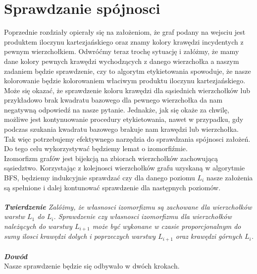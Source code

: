 \documentclass[12pt,a4paper,titlepage]{article}
\begin{document}
\section{Sprawdzanie spójnosci}
Poprzednie rozdziały opierały się na założeniom, że graf podany na wejsciu jest produktem iloczynu kartezjańskiego oraz znamy kolory krawędzi incydentych z pewnym wierzchołkiem. Odwróćmy teraz trochę sytuację i załóżmy, że mamy dane kolory pewnych krawędzi wychodzących z danego wierzchołka a naszym zadaniem będzie sprawdzenie, czy to algorytm etykietowania spowoduje, że nasze kolorowanie będzie kolorowaniem właciwym produktu iloczynu kartezjańskiego. Może się okazać, że sprawdzenie koloru krawędzi dla sąsiednich wierzchołków lub przykładowo brak kwadratu bazowego dla pewnego wierzchołka da nam negatywną odpowiedź na nasze pytanie. Jednakże, jak się okaże za chwilę, możliwe jest kontynuowanie procedury etykietowania, nawet w przypadku, gdy podczas szukania kwadratu bazowego brakuje nam krawędzi lub wierzchołka.\\
Tak więc potrzebujemy efektywnego narzędzia do sprawdzania spójnosci założeń. Do tego celu wykorzystywać będziemy lemat o izomorfiźmie.\\
Izomorfizm grafów jest bijekcją na zbiorach wierzchołków zachowującą sąsiedztwo. Korzystając z kolejnosci wierzchołków grafu uzyskaną w algorytmie BFS, będziemy indukcyjnie sprawdzać czy dla danego poziomu $L_i$ nasze założenia są spełnione i dalej kontunować sprawdzenie dla następnych poziomów. \\
\\
\textit{\textbf{Twierdzenie} Zalóżmy, że własnosci izomorfizmu są zachowane dla wierzchołków warstw $L_1$ do $L_i$. Sprawdzenie czy własnosci izomorfizmu dla wierzchołków należących do warstwy $L_{i+1}$ może być wykonane w czasie proporcjonalnym do sumy ilosci krawędzi dolych i poprzeczych warstwy $L_{i+1}$ oraz krawędzi górnych $L_{i}$.} \\
\\
\textit{\textbf{Dowód}}\\
Nasze sprawdzenie będzie się odbywało w dwóch krokach.\\
\end{document}
